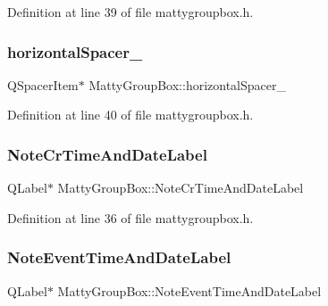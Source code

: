 Definition at line 39 of file mattygroupbox.\+h.

\hypertarget{classMattyGroupBox_a633d989baf5de2db6d0c01702ba6b410}{}\label{classMattyGroupBox_a633d989baf5de2db6d0c01702ba6b410} 
\subsubsection{\texorpdfstring{horizontal\+Spacer\+\_}{horizontalSpacer\_2}}
{\footnotesize\ttfamily Q\+Spacer\+Item$\ast$ Matty\+Group\+Box\+::horizontal\+Spacer\+\_\hspace{0.3cm}{\ttfamily [private]}}



Definition at line 40 of file mattygroupbox.\+h.

\hypertarget{classMattyGroupBox_a1a71503d5ede703b934e4f02d932a038}{}\label{classMattyGroupBox_a1a71503d5ede703b934e4f02d932a038} 
\subsubsection{\texorpdfstring{Note\+Cr\+Time\+And\+Date\+Label}{NoteCrTimeAndDateLabel}}
{\footnotesize\ttfamily Q\+Label$\ast$ Matty\+Group\+Box\+::\+Note\+Cr\+Time\+And\+Date\+Label\hspace{0.3cm}{\ttfamily [private]}}



Definition at line 36 of file mattygroupbox.\+h.

\hypertarget{classMattyGroupBox_a97b192413385021b01b34db7493f8b49}{}\label{classMattyGroupBox_a97b192413385021b01b34db7493f8b49} 
\subsubsection{\texorpdfstring{Note\+Event\+Time\+And\+Date\+Label}{NoteEventTimeAndDateLabel}}
{\footnotesize\ttfamily Q\+Label$\ast$ Matty\+Group\+Box\+::\+Note\+Event\+Time\+And\+Date\+Label\hspace{0.3cm}{\ttfamily [private]}}



